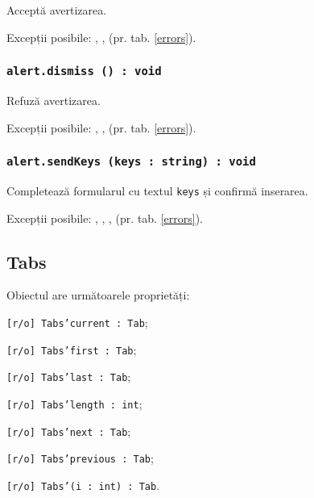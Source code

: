 Acceptă avertizarea.

Excepții posibile: , ,  (pr. tab. \ref{errors}).

\subsubsection{\texttt{alert.dismiss () : void}}

Refuză avertizarea.

Excepții posibile: , ,  (pr. tab. \ref{errors}).

\subsubsection{\texttt{alert.sendKeys (keys : string) : void}}

Completează formularul cu textul \texttt{keys} și confirmă inserarea.

Excepții posibile: , , ,  (pr. tab. \ref{errors}).

\subsection{{\color{orange} Tabs}}

Obiectul \tabs{} are următoarele proprietăți:
\begin{icItems}
	\item \texttt{[r/o] Tabs'current : Tab};
	\item \texttt{[r/o] Tabs'first : Tab};
	\item \texttt{[r/o] Tabs'last : Tab};
	\item \texttt{[r/o] Tabs'length : int};
	\item \texttt{[r/o] Tabs'next : Tab};
	\item \texttt{[r/o] Tabs'previous : Tab};
	\item \texttt{[r/o] Tabs'(i : int) : Tab}.
\end{icItems}

